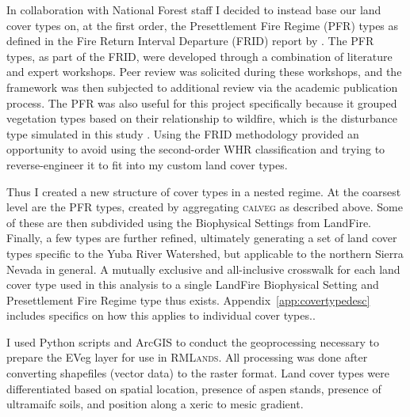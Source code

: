 %
In collaboration with National Forest staff I decided to instead base our land cover types on, at the first order, the Presettlement Fire Regime (PFR) types as defined in the Fire Return Interval Departure (FRID) report by \citet{VandeWater2011}. The PFR types, as part of the FRID, were developed through a combination of literature and expert workshops. Peer review was solicited during these workshops, and the framework was then subjected to additional review via the academic publication process. The PFR was also useful for this project specifically because it grouped vegetation types based on their relationship to wildfire, which is the disturbance type simulated in this study \citep{VandeWater2011}. Using the FRID methodology provided an opportunity to avoid using the second-order WHR classification and trying to reverse-engineer it to fit into my custom land cover types. 

Thus I created a new structure of cover types in a nested regime. At the coarsest level are the PFR types, created by aggregating \textsc{calveg} as described above. Some of these are then subdivided using the Biophysical Settings from LandFire. Finally, a few types are further refined, ultimately generating a set of land cover types specific to the Yuba River Watershed, but applicable to the northern Sierra Nevada in general. A mutually exclusive and all-inclusive crosswalk for each land cover type used in this analysis to a single LandFire Biophysical Setting and Presettlement Fire Regime type thus exists. Appendix~\ref{app:covertypedesc} includes specifics on how this applies to individual cover types..

I used Python scripts and ArcGIS to conduct the geoprocessing necessary to prepare the EVeg layer for use in \textsc{RMLands}. All processing was done after converting shapefiles (vector data) to the raster format. Land cover types were differentiated based on spatial location, presence of aspen stands, presence of ultramaifc soils, and position along a xeric to mesic gradient. 

